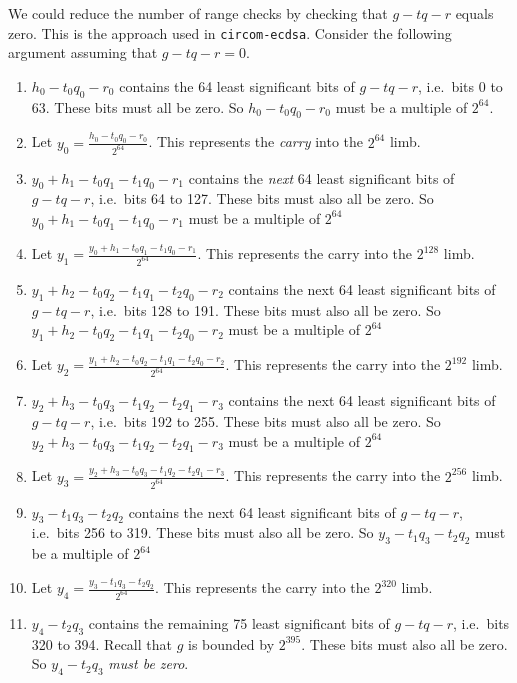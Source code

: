 \documentclass[a4paper, 12pt]{article}
\begin{document}
We could reduce the number of range checks by checking that $g-tq-r$ equals zero. This is the approach used in \texttt{circom-ecdsa}. Consider the following argument assuming that $g-tq-r = 0$.
\begin{enumerate}
  \item $h_0-t_0q_0-r_0$ contains the 64 least significant bits of $g-tq-r$, i.e.~bits 0 to 63. These bits must all be zero. So $h_0-t_0q_0-r_0$ must be a multiple of $2^{64}$. 
  \item Let $y_0 = \frac{h_0-t_0q_0-r_0}{2^{64}}$. This represents the \textit{carry} into the $2^{64}$ limb.
  \item $y_0+h_1-t_0q_1-t_1q_0-r_1$ contains the \textit{next} 64 least significant bits of $g-tq-r$, i.e.~bits 64 to 127. These bits must also all be zero. So $y_0+h_1-t_0q_1-t_1q_0-r_1$ must be a multiple of $2^{64}$
  \item Let $y_1 = \frac{y_0+h_1-t_0q_1-t_1q_0-r_1}{2^{64}}$. This represents the carry into the $2^{128}$ limb.
  \item $y_1+h_2-t_0q_2-t_1q_1-t_2q_0-r_2$ contains the next 64 least significant bits of $g-tq-r$, i.e.~bits 128 to 191. These bits must also all be zero. So $y_1+h_2-t_0q_2-t_1q_1-t_2q_0-r_2$ must be a multiple of $2^{64}$
  \item Let $y_2 = \frac{y_1+h_2-t_0q_2-t_1q_1-t_2q_0-r_2}{2^{64}}$. This represents the carry into the $2^{192}$ limb.
  \item $y_2+h_3-t_0q_3-t_1q_2-t_2q_1-r_3$ contains the next 64 least significant bits of $g-tq-r$, i.e.~bits 192 to 255. These bits must also all be zero. So $y_2+h_3-t_0q_3-t_1q_2-t_2q_1-r_3$ must be a multiple of $2^{64}$
  \item Let $y_3 = \frac{y_2+h_3-t_0q_3-t_1q_2-t_2q_1-r_3}{2^{64}}$. This represents the carry into the $2^{256}$ limb.
  \item $y_3-t_1q_3-t_2q_2$ contains the next 64 least significant bits of $g-tq-r$, i.e.~bits 256 to 319. These bits must also all be zero. So $y_3-t_1q_3-t_2q_2$ must be a multiple of $2^{64}$
  \item Let $y_4 = \frac{y_3-t_1q_3-t_2q_2}{2^{64}}$. This represents the carry into the $2^{320}$ limb.
  \item $y_4-t_2q_3$ contains the remaining 75 least significant bits of $g-tq-r$, i.e.~bits 320 to 394. Recall that $g$ is bounded by $2^{395}$. These bits must also all be zero. So $y_4-t_2q_3$ \textit{must be zero}.
\end{enumerate}
\end{document}
